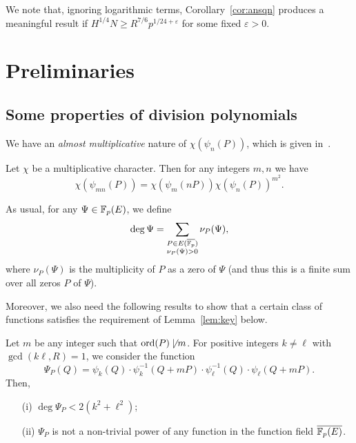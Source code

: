 \documentclass[12pt]{amsart}
\begin{document}
We note that, ignoring logarithmic terms, Corollary~\ref{cor:ansqn} produces a meaningful 
result if $H^{1/4} N \ge R^{7/6}p^{1/24+\varepsilon}$ for some fixed $\varepsilon> 0$. 


\section{Preliminaries}\label{sec:elliptic}

\subsection{Some properties of   division polynomials} 

We have an \textit{almost multiplicative} nature of $\chi(\psi_n(P))$, which is given in~\cite[Lemma~3.2]{ShSt}. 

\begin{lem}\label{lem:mult}
    Let $\chi$ be a multiplicative character. Then for any integers $m,n$   we have
\[
\chi(\psi_{mn}(P))=\chi(\psi_m(nP))\chi(\psi_n(P))^{m^2}.
\]
\end{lem} 



As usual, for any $\Psi\in {\mathbb F}_p(E)$, we define
\[
\deg \Psi=\sum_{\substack{P\in E(\overline{{\mathbb F}_p})\\ \nu_P(\Psi)>0}} \nu_{P}(\Psi),
\]
where  $\nu_{P}(\Psi)$ is the multiplicity of $P$ as a zero of $\Psi$ (and thus this is a finite sum over 
all zeros $P$ of $\Psi$). 

Moreover, we also need the following results to show that a certain class of functions satisfies the requirement of Lemma~\ref{lem:key} below. 

\begin{lem}\label{lem:notpower}
Let $m$ be any integer such that $\mathrm{ord}(P)\not\mid m$. For positive integers $k \neq \ell$ with $\gcd(k\ell ,R)=1$, we consider the function
\[
\Psi_P(Q)=\psi_{k}(Q)\cdot \psi_{k}^{-1}(Q+mP)\cdot \psi^{-1}_{\ell}(Q)\cdot \psi_{\ell}(Q+mP).
\]
Then,
\begin{enumerate}
\item[(i)] $\deg \Psi_P < 2(k^2+ \ell^2)$; 
    \item[(ii)] $\Psi_P$ is not a non-trivial power of any function in the function field $\overline{{\mathbb F}_p(E)}$.
    \end{enumerate}
\end{lem} 
\end{document}
